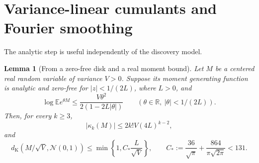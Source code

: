 \documentclass[11pt]{article}
\numberwithin{equation}{section}
\newtheorem{lemma}[theorem]{Lemma}
\theoremstyle{remark}
\newcommand{\E}{\mathbb E}
\newcommand{\R}{\mathbb R}
\newcommand{\dK}{d_{\mathrm K}}
\newcommand{\Normal}{\mathcal N(0,1)}
\begin{document}
\section{Variance-linear cumulants and Fourier smoothing}\label{sec:analytic}

The analytic step is useful independently of the discovery model.

\begin{lemma}[From a zero-free disk and a real moment bound]
\label{lem:analytic}
Let $M$ be a centered real random variable of variance $V>0$. Suppose its
moment generating function is analytic and zero-free for $|z|<1/(2L)$,
where $L>0$, and
\begin{equation}\label{eq:generalmgf}
 \log\E e^{\theta M}
 \le\frac{V\theta^2}{2(1-2L|\theta|)}
 \qquad(\theta\in\R,\ |\theta|<1/(2L)).
\end{equation}
Then, for every $k\ge3$,
\begin{equation}\label{eq:cumulantbound}
 |\kappa_k(M)|\le2k!V(4L)^{k-2},
\end{equation}
and
\begin{equation}\label{eq:abstractBE}
 \dK(M/\sqrt V,\Normal)
 \le\min\left\{1,C_*\frac L{\sqrt V}\right\},
 \qquad
 C_*:=\frac{36}{\sqrt\pi}+\frac{864}{\pi\sqrt{2\pi}}<131.
\end{equation}
\end{lemma}
\end{document}
